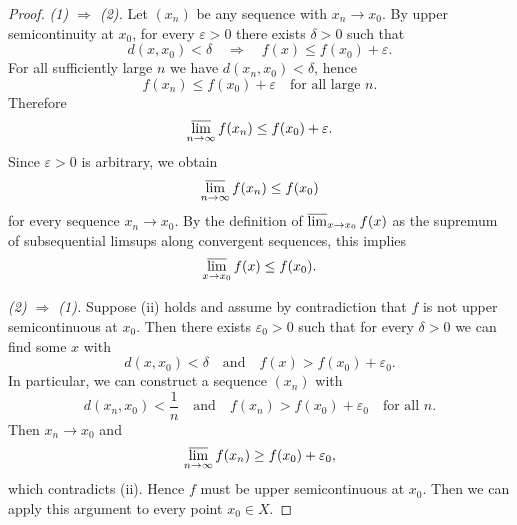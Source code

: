 \documentclass[12pt]{article}
\renewcommand{\(}{\left(}%
\renewcommand{\)}{\right)}%
\renewcommand{\[}{\left[}%
\renewcommand{\]}{\right]}%
\newtheorem{proof}{Proof.}}
\begin{document}
\begin{proof}
\emph{(1) $\Rightarrow$ (2).}
Let $(x_n)$ be any sequence with $x_n \to x_0$.
By upper semicontinuity at $x_0$, for every $\varepsilon>0$ there
exists $\delta>0$ such that
\begin{equation*}
d(x,x_0) < \delta
\quad\Longrightarrow\quad
f(x) \leq f(x_0) + \varepsilon.
\end{equation*}
For all sufficiently large $n$ we have $d(x_n,x_0)<\delta$, hence
\begin{equation*}
f(x_n) \leq f(x_0)+\varepsilon
\quad\text{for all large } n.
\end{equation*}
Therefore
\begin{equation*}
\varlimsup_{n\to\infty} f(x_n)
\leq
f(x_0)+\varepsilon.
\end{equation*}
Since $\varepsilon>0$ is arbitrary, we obtain
\begin{equation*}
\varlimsup_{n\to\infty} f(x_n)
\leq f(x_0)
\end{equation*}
for every sequence $x_n \to x_0$.
By the definition of $\varlimsup_{x\to x_0} f(x)$ as the supremum of
subsequential limsups along convergent sequences, this implies
\begin{equation*}
\varlimsup_{x\to x_0} f(x) \leq f(x_0).
\end{equation*}

\medskip

\emph{(2) $\Rightarrow$ (1).}
Suppose (ii) holds and assume by contradiction that $f$ is not upper
semicontinuous at $x_0$.
Then there exists $\varepsilon_0>0$ such that for every $\delta>0$
we can find some $x$ with
\begin{equation*}
d(x,x_0) < \delta
\quad\text{and}\quad
f(x) > f(x_0) + \varepsilon_0.
\end{equation*}
In particular, we can construct a sequence $(x_n)$ with
\begin{equation*}
d(x_n,x_0) < \frac{1}{n}
\quad\text{and}\quad
f(x_n) > f(x_0)+\varepsilon_0
\quad\text{for all } n.
\end{equation*}
Then $x_n\to x_0$ and
\begin{equation*}
\varlimsup_{n\to\infty} f(x_n)
\geq
f(x_0)+\varepsilon_0,
\end{equation*}
which contradicts (ii).
Hence $f$ must be upper semicontinuous at $x_0$. Then we can apply this argument to every point $x_0\in X$.

\medskip


\end{proof}
\end{document}
